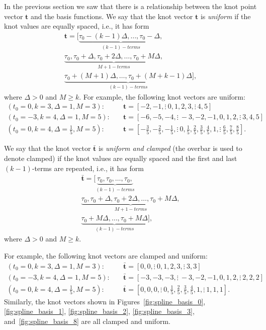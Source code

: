 In the previous section we saw that there is a relationship between the knot point vector $\mathbf{t}$ and the basis functions.  We say that the knot vector $\mathbf{t}$ is {\em uniform} if the knot values are equally spaced, i.e., it has form
\begin{multline*}
\mathbf{t} = [\underbrace{\tau_0-(k-1)\Delta, \dots, \tau_0-\Delta,}_{(k-1)-terms} \\
			 \underbrace{\tau_0, \tau_0+\Delta, \tau_0+2\Delta, \dots, \tau_0+M\Delta,}_{M+1-terms} \\
			 \underbrace{\tau_0+(M+1)\Delta, \dots, \tau_0+(M+k-1)\Delta}_{(k-1)-terms}],	
\end{multline*}
where $\Delta>0$ and $M\geq k$.  
For example, the following knot vectors are uniform:
\begin{align*}
	(t_0=0, k=3, \Delta=1, M=3):\quad & \mathbf{t} = [-2, -1, \vdots~ 0, 1, 2, 3, \vdots~ 4, 5] \\
	(t_0=-3, k=4, \Delta=1, M=5):\quad & \mathbf{t} = [-6, -5, -4,\vdots~  -3, -2, -1, 0, 1, 2, \vdots~ 3, 4, 5] \\
	(t_0=0, k=4, \Delta=\frac{1}{5}, M=5):\quad & \mathbf{t} = [-\frac{3}{5}, -\frac{2}{5}, -\frac{1}{5}, \vdots~  0, \frac{1}{5}, \frac{2}{5}, \frac{3}{5}, \frac{4}{5}, 1, \vdots~  \frac{6}{5}, \frac{7}{5}, \frac{8}{5}].	
\end{align*}

 We say that the knot vector $\bar{\mathbf{t}}$ is {\em uniform and clamped} (the overbar is used to denote clamped) if the knot values are equally spaced and the first and last $(k-1)$-terms are repeated, i.e., it has form
\begin{multline*}
\bar{\mathbf{t}} = [\underbrace{\tau_0, \tau_0, \dots, \tau_0,}_{(k-1)-terms} \\
			 \underbrace{\tau_0, \tau_0+\Delta, \tau_0+2\Delta, \dots, \tau_0+M\Delta,}_{M+1-terms} \\
			 \underbrace{\tau_0+M\Delta, \dots, \tau_0+M\Delta}_{(k-1)-terms}],	
\end{multline*}
where $\Delta>0$ and $M\geq k$.  

For example, the following knot vectors are clamped and uniform:
\begin{align*}
	(t_0=0, k=3, \Delta=1, M=3):\quad & \bar{\mathbf{t}} = [0, 0, \vdots~ 0, 1, 2, 3, \vdots~ 3, 3] \\
	(t_0=-3, k=4, \Delta=1, M=5):\quad & \bar{\mathbf{t}} = [-3, -3, -3, \vdots~ -3, -2, -1, 0, 1, 2, \vdots~ 2, 2, 2] \\
	(t_0=0, k=4, \Delta=\frac{1}{5}, M=5):\quad & \bar{\mathbf{t}} = [0, 0, 0, \vdots~ 0, \frac{1}{5}, \frac{2}{5}, \frac{3}{5}, \frac{4}{5}, 1, \vdots~ 1, 1, 1].	
\end{align*}
Similarly, the knot vectors shown in Figures~\ref{fig:spline_basis_0}, \ref{fig:spline_basis_1}, \ref{fig:spline_basis_2}, \ref{fig:spline_basis_3}, and~\ref{fig:spline_basis_8} are all clamped and uniform.  

